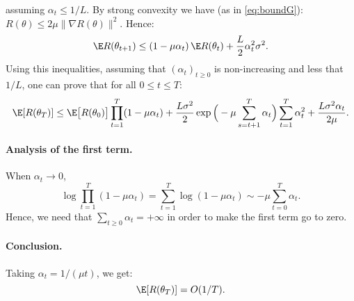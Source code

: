 \documentclass[11pt,nocut]{article}
\begin{document}
assuming $\alpha_t \leq 1/L$.
By strong convexity we have (as in \eqref{eq:boundG}): $R(\theta) \leq 2 \mu \|\nabla R(\theta)\|^2$. Hence:
$$
\E R(\theta_{t+1}) \leq \left(1 - \mu \alpha_t\right)\E R(\theta_t)  + \frac{L}{2}\alpha_t^2  \sigma^2 .
$$
Using this inequalities, assuming that $(\alpha_t)_{t \geq 0}$ is non-increasing and less that $1/L$, one can prove that for all $0 \leq t \leq T$:
$$
\E [R(\theta_{T})] \leq \E \big[R(\theta_0)\big] \prod_{t=1}^T (1-\mu \alpha_t) 
+ \frac{L \sigma^2}{2} \exp\Big(-\mu \sum_{s=t+1}^T \alpha_t\Big) \sum_{t=1}^T \alpha_t^2 + \frac{L\sigma^2\alpha_t}{2\mu}.
$$

\paragraph{Analysis of the first term.}
When $\alpha_t \to 0$, 
$$\log \prod_{t=1}^T (1-\mu \alpha_t) =\sum_{t=1}^T \log (1-\mu \alpha_t) \sim - \mu \sum_{t=0}^{T} \alpha_t.$$
Hence, we need that $\sum_{t \geq 0} \alpha_t = +\infty$ in order to make the first term go to zero.
\\

\paragraph{Conclusion.}
Taking $\alpha_t = 1/(\mu t)$, we get:
$$
\E[R(\theta_T)] = O(1/T).
$$
\end{document}
